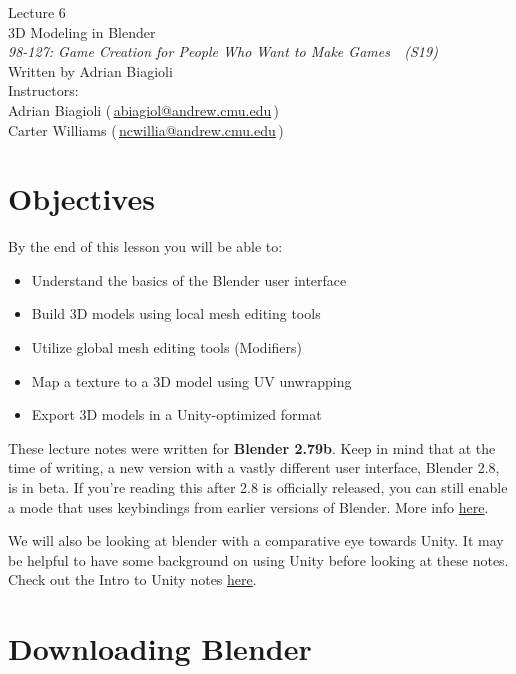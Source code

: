 \documentclass[11pt]{article}
\makeatletter
\newcommand{\lecturenum}{6}
\newcommand{\lecturename}{3D Modeling in Blender}
\newcommand{\authorname}{Adrian Biagioli}
\newcommand{\coursenum}{98-127}
\newcommand{\coursename}{Game Creation for People Who Want to Make Games}
\newcommand{\coursesem}{S19}
\newcommand{\instructors}{Adrian Biagioli (\,\href{mailto:abiagiol@andrew.cmu.edu}{abiagiol@andrew.cmu.edu}\,) \\ Carter Williams (\,\href{mailto:ncwillia@andrew.cmu.edu}{ncwillia@andrew.cmu.edu}\,)}
\makeatother
\begin{document}
\thispagestyle{plain}
{
    \vspace{1.5em}
    \begin{center}
    {
        \huge
        Lecture \lecturenum \\
        \vspace{0.5em}
        \lecturename
        \vspace{0.4em}
    } \\
    {
        \it
        \coursenum: \coursename\ \ (\coursesem)
    } \\
    \vspace{1.0em}
    Written by \authorname \\
    \vspace{0.7em}
    Instructors:\\ \instructors
    \end{center}
}

\section{Objectives}

By the end of this lesson you will be able to:
\begin{itemize}
    \item Understand the basics of the Blender user interface
    \item Build 3D models using local mesh editing tools
    \item Utilize global mesh editing tools (Modifiers)
    \item Map a texture to a 3D model using UV unwrapping
    \item Export 3D models in a Unity-optimized format
\end{itemize}

\noindent These lecture notes were written for {\bf Blender 2.79b}.  Keep in mind that at the time 
of writing, a new version with a vastly different user interface, Blender 2.8, is in beta. If you're
reading this after 2.8 is officially released, you can still enable a mode that uses keybindings
from earlier versions of Blender.  More info \href{https://wiki.blender.org/wiki/Reference/Release_Notes/2.80/UI}{here}.

We will also be looking at blender with a comparative eye towards Unity.  It may be helpful to have
some background on using Unity before looking at these notes.  Check out the Intro to Unity notes
\href{http://stage.gamecreation.org/StuCo/lectures/lec02.pdf}{here}.

\section{Downloading Blender}
\end{document}
